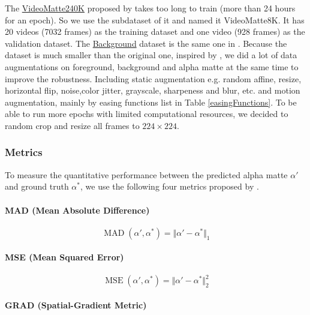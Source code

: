 \documentclass[final]{cvpr}
\begin{document}
The \href{https://grail.cs.washington.edu/projects/background-matting-v2/#/datasets}{VideoMatte240K} proposed by \cite{linRealTimeHighResolutionBackground2020a} takes too long to train (more than 24 hours for an epoch).
So we use the subdataset of it and named it VideoMatte8K.
It has 20 videos (7032 frames) as the training dataset and one video (928 frames) as the validation dataset.
The \href{https://grail.cs.washington.edu/projects/background-matting-v2/#/datasets}{Background} dataset is the same one in \cite{linRealTimeHighResolutionBackground2020a}. Because the dataset is much smaller than the original one, inspired by \cite{linRobustHighResolutionVideo2021}, we did a lot of data augmentations on foreground, background and alpha matte at the same time to improve the robustness.
Including static augmentation e.g. random affine, resize, horizontal flip, noise,color jitter, grayscale, sharpeness and blur, etc. and motion augmentation, mainly by easing functions list in Table \ref{easingFunctions}.
To be able to run more epochs with limited computational resources, we decided to random crop and resize all frames to $224 \times 224$.

\subsubsection{Metrics}

To measure the quantitative performance between the predicted alpha matte $\alpha'$ and ground truth $\alpha^*$, we use the following four metrics proposed by \cite{Rhemann2009APM}.

\paragraph{MAD (Mean Absolute Difference)}

\begin{equation}\label{mad}
    \operatorname{MAD}(\alpha', \alpha^*)=\Vert\alpha'-\alpha^*\Vert_1
\end{equation}

\paragraph{MSE (Mean Squared Error)}

\begin{equation}\label{mse}
    \operatorname{MSE}(\alpha', \alpha^*)=\Vert\alpha'-\alpha^*\Vert_2^2
\end{equation}

\paragraph{GRAD (Spatial-Gradient Metric)}
\end{document}
